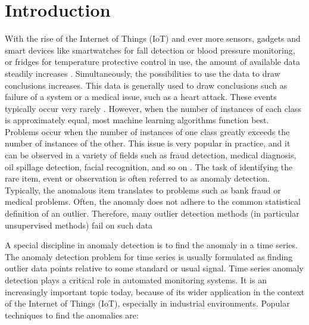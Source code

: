 
\chapter{Introduction} %

\label{1.} %


\newcommand{\keyword}[1]{\textbf{#1}}
\newcommand{\tabhead}[1]{\textbf{#1}}
\newcommand{\code}[1]{\texttt{#1}}
\newcommand{\file}[1]{\texttt{\bfseries#1}}
\newcommand{\option}[1]{\texttt{\itshape#1}}




With the rise of the Internet of Things (IoT) and ever more sensors, gadgets and smart devices like smartwatches for fall detection or blood pressure monitoring, or fridges for temperature protective control in use, the amount of available data steadily increases \parencite{Alansari2018}. Simultaneously, the possibilities to use the data to draw conclusions increases. This data is generally used to draw conclusions such as failure of a system or a medical issue, such as a heart attack. These events typically occur very rarely \parencite{Hauskrecht2007}. However, when the number of instances of each class is approximately equal, most machine learning algorithms function best. Problems occur when the number of instances of one class greatly exceeds the number of instances of the other. This issue is very popular in practice, and it can be observed in a variety of fields such as fraud detection, medical diagnosis, oil spillage detection, facial recognition, and so on \parencite{Thabtah2020}. The task of identifying the rare item, event or observation is often referred to as anomaly detection. Typically, the anomalous item translates to problems such as bank fraud or medical problems. Often, the anomaly does not adhere to the common statistical definition of an outlier. Therefore, many outlier detection methods (in particular unsupervised methods) fail on such data \parencite{Hodge2004}

A special discipline in anomaly detection is to find the anomaly in a time series. The anomaly detection problem for time series is usually formulated as finding outlier data points relative to some standard or usual signal. Time series anomaly detection plays a critical role in automated monitoring systems. It is an increasingly important topic today, because of its wider application in the context of the Internet of Things (IoT), especially in industrial environments. Popular techniques to find the anomalies are:

